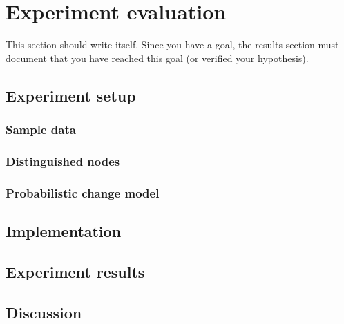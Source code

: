 \chapter{Experiment evaluation}

This section should write itself. Since you have a goal, the results section must document that you have reached this goal (or verified your hypothesis).

\section{Experiment setup}
\subsection{Sample data}
\subsection{Distinguished nodes}
\subsection{Probabilistic change model}

\section{Implementation}

\section{Experiment results}

\section{Discussion}

